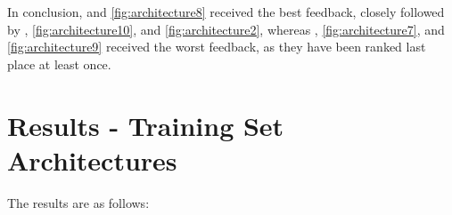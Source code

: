 In conclusion,  and \ref{fig:architecture8} received the best feedback, 
closely followed by , \ref{fig:architecture10}, and \ref{fig:architecture2},
whereas , \ref{fig:architecture7}, and \ref{fig:architecture9} received the worst feedback, as they have been ranked last place at least once.

\newpage

\section{Results - Training Set Architectures}
\label{sec:trainresults}

The results are as follows:


